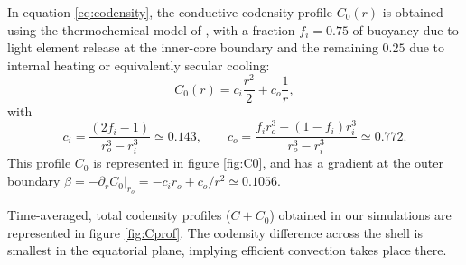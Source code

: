 \documentclass[12pt, a4paper]{article}
\begin{document}
In equation \ref{eq:codensity}, the conductive codensity profile $C_0(r)$ is obtained using the thermochemical model of \citet{aubert2009}, 
with a fraction $f_i = 0.75$ of buoyancy due to light element release at the inner-core boundary and the remaining $0.25$ due to internal heating or equivalently secular cooling:
\begin{equation}
C_0(r) =  c_i \frac{r^2}{2} + c_o \frac{1}{r},   \label{eq:C0}
\end{equation}
with
\begin{equation}
c_i = \frac{(2f_i-1)}{r_o^3 - r_i^3} \simeq 0.143, \quad \quad c_o = \frac{f_i r_o^3 - (1-f_i) r_i^3}{r_o^3 - r_i^3} \simeq 0.772.
\end{equation}
This profile $C_0$ is represented in figure \ref{fig:C0}, and has a gradient at the outer boundary $\beta = -\partial_r C_0|_{r_o} = -c_i r_o + c_o/r^2 \simeq 0.1056$.


Time-averaged, total codensity profiles ($C+C_0$) obtained in our simulations are represented in figure \ref{fig:Cprof}.
The codensity difference across the shell is smallest in the equatorial plane, implying efficient convection takes place there.


%
%


\footnotesize
\setlength{\bibsep}{1ex plus 0.3ex}

%
\end{document}
